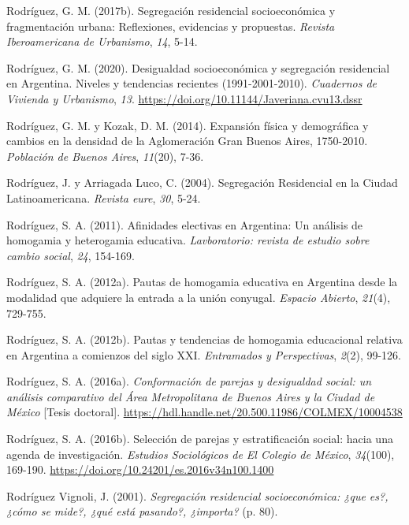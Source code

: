 \documentclass[
  spanish,
  a4paper,%
  chapterprefix=true,%
  DIV=calc,%
  twoside]{scrbook}%
\newlength{\cslhangindent}
\newenvironment{CSLReferences}[2] %
 {\begin{list}{}{%
  \setlength{\itemindent}{0pt}
  \setlength{\leftmargin}{0pt}
  \setlength{\parsep}{0pt}
  \ifodd #1
   \setlength{\leftmargin}{\cslhangindent}
   \setlength{\itemindent}{-1\cslhangindent}
  \fi
  \setlength{\itemsep}{#2\baselineskip}}}
 {\end{list}}
\begin{document}
\begin{CSLReferences}{1}{0}
Rodríguez, G. M. (2017b). Segregación residencial socioeconómica y fragmentación urbana: Reflexiones, evidencias y propuestas. \emph{Revista Iberoamericana de Urbanismo}, \emph{14}, 5-14.

Rodríguez, G. M. (2020). Desigualdad socioeconómica y segregación residencial en Argentina. Niveles y tendencias recientes (1991-2001-2010). \emph{Cuadernos de Vivienda y Urbanismo}, \emph{13}. \url{https://doi.org/10.11144/Javeriana.cvu13.dssr}

Rodríguez, G. M. y Kozak, D. M. (2014). Expansión física y demográfica y cambios en la densidad de la Aglomeración Gran Buenos Aires, 1750-2010. \emph{Población de Buenos Aires}, \emph{11}(20), 7-36.

Rodríguez, J. y Arriagada Luco, C. (2004). Segregación Residencial en la Ciudad Latinoamericana. \emph{Revista eure}, \emph{30}, 5-24.

Rodríguez, S. A. (2011). Afinidades electivas en Argentina: Un análisis de homogamia y heterogamia educativa. \emph{Lavboratorio: revista de estudio sobre cambio social}, \emph{24}, 154-169.

Rodríguez, S. A. (2012a). Pautas de homogamia educativa en Argentina desde la modalidad que adquiere la entrada a la unión conyugal. \emph{Espacio Abierto}, \emph{21}(4), 729-755.

Rodríguez, S. A. (2012b). Pautas y tendencias de homogamia educacional relativa en Argentina a comienzos del siglo XXI. \emph{Entramados y Perspectivas}, \emph{2}(2), 99-126.

Rodríguez, S. A. (2016a). \emph{Conformación de parejas y desigualdad social: un análisis comparativo del Área Metropolitana de Buenos Aires y la Ciudad de México} {[}Tesis doctoral{]}. \url{https://hdl.handle.net/20.500.11986/COLMEX/10004538}

Rodríguez, S. A. (2016b). Selección de parejas y estratificación social: hacia una agenda de investigación. \emph{Estudios Sociológicos de El Colegio de México}, \emph{34}(100), 169-190. \url{https://doi.org/10.24201/es.2016v34n100.1400}

Rodríguez Vignoli, J. (2001). \emph{Segregación residencial socioeconómica: ¿que es?, ¿cómo se mide?, ¿qué está pasando?, ¿importa?} (p. 80).


\end{CSLReferences}
\end{document}
